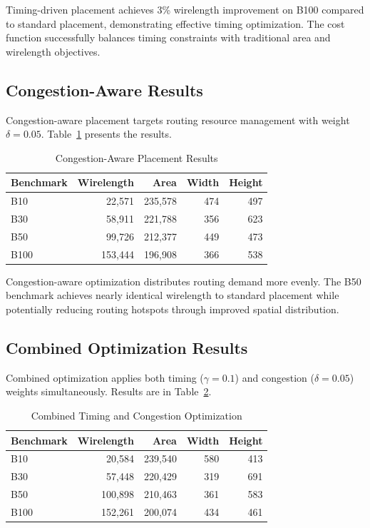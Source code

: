\documentclass[11pt]{article}
\begin{document}
Timing-driven placement achieves 3\% wirelength improvement on B100 compared to standard placement, demonstrating effective timing optimization. The cost function successfully balances timing constraints with traditional area and wirelength objectives.

\subsection{Congestion-Aware Results}

Congestion-aware placement targets routing resource management with weight $\delta = 0.05$. Table~\ref{tab:congestion} presents the results.

\begin{table}[H]
\centering
\caption{Congestion-Aware Placement Results}
\label{tab:congestion}
\begin{tabular}{|l|r|r|r|r|}
\hline
\textbf{Benchmark} & \textbf{Wirelength} & \textbf{Area} & \textbf{Width} & \textbf{Height} \\
\hline
B10  & 22,571  & 235,578 & 474 & 497 \\
B30  & 58,911  & 221,788 & 356 & 623 \\
B50  & 99,726  & 212,377 & 449 & 473 \\
B100 & 153,444 & 196,908 & 366 & 538 \\
\hline
\end{tabular}
\end{table}

Congestion-aware optimization distributes routing demand more evenly. The B50 benchmark achieves nearly identical wirelength to standard placement while potentially reducing routing hotspots through improved spatial distribution.

\subsection{Combined Optimization Results}

Combined optimization applies both timing ($\gamma = 0.1$) and congestion ($\delta = 0.05$) weights simultaneously. Results are in Table~\ref{tab:combined}.

\begin{table}[H]
\centering
\caption{Combined Timing and Congestion Optimization}
\label{tab:combined}
\begin{tabular}{|l|r|r|r|r|}
\hline
\textbf{Benchmark} & \textbf{Wirelength} & \textbf{Area} & \textbf{Width} & \textbf{Height} \\
\hline
B10  & 20,584  & 239,540 & 580 & 413 \\
B30  & 57,448  & 220,429 & 319 & 691 \\
B50  & 100,898 & 210,463 & 361 & 583 \\
B100 & 152,261 & 200,074 & 434 & 461 \\
\hline
\end{tabular}
\end{table}
\end{document}
